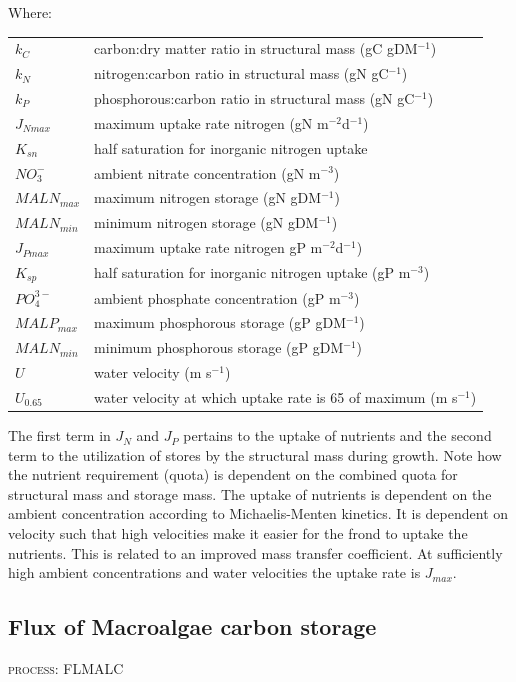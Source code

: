 \documentclass{deltares_manual}
\begin{document}
Where:\\

\begin{tabular}{ll}
$k_C$        & carbon:dry matter ratio in structural mass (gC gDM$^{-1}$)\\
$k_N$        & nitrogen:carbon ratio in structural mass (gN gC$^{-1}$)\\
$k_P$        & phosphorous:carbon ratio in structural mass (gN gC$^{-1}$)\\
$J_{Nmax}$   & maximum uptake rate nitrogen (gN m$^{-2}$d$^{-1}$)\\
$K_{sn}$     & half saturation for inorganic nitrogen uptake\\
$NO_3^-$     & ambient nitrate concentration (gN m$^{-3}$)\\
$MALN_{max}$ & maximum nitrogen storage (gN gDM$^{-1}$)\\
$MALN_{min}$ & minimum nitrogen storage (gN gDM$^{-1}$)\\
$J_{Pmax}$   & maximum uptake rate nitrogen gP m$^{-2}$d$^{-1}$)\\
$K_{sp}$     & half saturation for inorganic nitrogen uptake (gP m$^{-3}$)\\
$PO_4^{3-}$  & ambient phosphate concentration (gP m$^{-3}$)\\
$MALP_{max}$ & maximum phosphorous storage (gP gDM$^{-1}$)\\
$MALN_{min}$ & minimum phosphorous storage (gP gDM$^{-1}$)\\
$U$          & water velocity (m s$^{-1}$)\\
$U_{0.65}$   & water velocity at which uptake rate is 65 of maximum (m s$^{-1}$)\\
\end{tabular}

The first term in $J_{N}$ and $J_{P}$ pertains to the uptake of nutrients and the second term to the utilization of stores by the structural mass during growth. Note how the nutrient requirement (quota) is dependent on the combined quota for structural mass and storage mass. The uptake of nutrients is dependent on the ambient concentration according to Michaelis-Menten kinetics. It is dependent on velocity such that high velocities make it easier for the frond to uptake the nutrients. This is related to an improved mass transfer coefficient. At sufficiently high ambient concentrations and water velocities the uptake rate is $J_{max}$.
\pagebreak

\subsection{Flux of Macroalgae carbon storage}
\begin{flushright}
\textsc{process: FLMALC}
\end{flushright}
\end{document}

